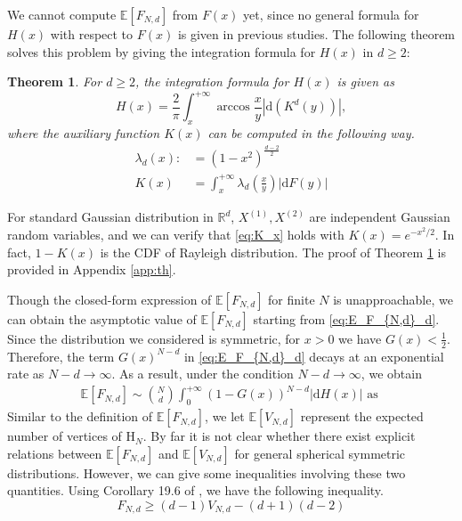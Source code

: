 \documentclass[conference,a4paper]{IEEEtran}
\def\E{\mathbb{E}}
\def\R{\mathbb{R}}
\def\dd{\mathrm{d}}
\newtheorem{theorem}{Theorem}
\begin{document}
We cannot compute $\E[F_{N,d}]$ from $F(x)$ yet, since no general formula for $H(x)$ with respect to $F(x)$ is given in previous studies.
The following theorem solves this problem by giving the integration formula for $H(x)$ in $d\geq 2$:
\begin{theorem}\label{thm:H}
For $d\geq 2$, the integration formula for $H(x)$ is given as
\begin{equation}
     H(x) = \frac{2}{\pi}
     \int_x^{+\infty} \arccos\frac{x}{y}
     |\mathrm{d} (K^d(y))|, \label{eq:H_expression_d_dim}
\end{equation}
where the auxiliary function $K(x)$ can be computed in the following way.
\begin{align}
     \lambda_d(x)  :&=(1-x^2)^{\frac{d-2}{2}}
     \label{eq:lambda_r}\\
     K(x)&=
        \int_x^{+\infty} 
     \lambda_d \left(\frac{x}{y} \right)|\dd F(y)|
     \label{eq:K_x}
\end{align}
\end{theorem}
For standard Gaussian distribution in $\R^d$,
$X^{(1)}, X^{(2)}$ are independent
Gaussian random variables, and we can verify that \eqref{eq:K_x} holds with $K(x) = e^{-x^2/2}$.
In fact, $1-K(x)$ is the CDF of Rayleigh distribution.
The proof of Theorem \ref{thm:H}
is provided in Appendix \ref{app:th}.

Though the closed-form expression of $\E[F_{N,d}]$
for finite $N$ is unapproachable,
we can obtain the
asymptotic value of $\E[F_{N,d}]$ starting from \eqref{eq:E_F_{N,d}_d}.
Since the distribution we considered is symmetric,
for $x>0$ we have $G(x)<\frac{1}{2}$. Therefore, the
term $G(x)^{N-d}$ in \eqref{eq:E_F_{N,d}_d} decays at an exponential rate as $N-d\to \infty$.
As a result, under the condition $N-d\to \infty$, we obtain
\begin{align}
     \E[F_{N,d}] \sim \binom{N}{d} \int_0^{+\infty} 
      (1-G(x))^{N-d} |\dd H(x)| \textrm{ as } 
     \label{eq:E_F_N_d_d_sim}
\end{align}
Similar to the definition of $\E[F_{N,d}]$,
we let $\E[V_{N,d}]$ represent the expected number of
vertices of $\mathrm{H}_N$.
By far it is not clear whether there exist explicit relations
between $\E[F_{N,d}]$ and $\E[V_{N,d}]$
for general spherical symmetric distributions.
However, we can give some inequalities involving these two
quantities. Using Corollary 19.6 of \cite{brondsted2012introduction}, we have the following
inequality.
\begin{equation}\label{eq:F_V_upper}
     F_{N,d} \geq (d-1) V_{N,d} - (d+1)(d-2)
\end{equation}
\end{document}
